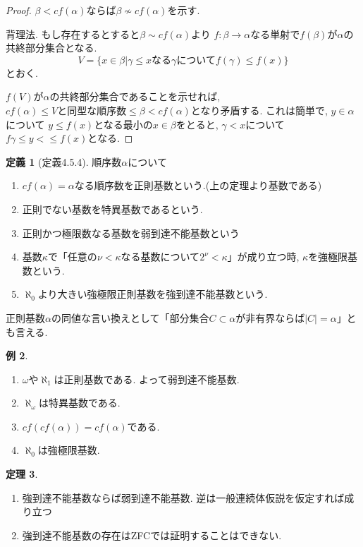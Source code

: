 \documentclass[dvipdfmx,a4paper,11pt]{article}
\theoremstyle{definition}
\newtheorem{thm}{定理}
\newtheorem{dfn}[thm]{定義}
\newtheorem{exa}[thm]{例}
\begin{document}
\begin{proof}
$\beta < cf(\alpha)$ならば$\beta \not \sim cf(\alpha)$を示す.

背理法. もし存在するとすると$\beta \sim cf(\alpha)$より
$f : \beta \to \alpha$なる単射で$f(\beta)$が$\alpha$の共終部分集合となる. 
$$
V= \{ x \in \beta| \gamma \le x \text{なる$\gamma$について} f(\gamma) \le f(x)\}
$$
とおく. 

$f(V)$が$\alpha$の共終部分集合であることを示せれば, $cf(\alpha) \le \text{$V$と同型な順序数} \le \beta < cf(\alpha)$となり矛盾する.
これは簡単で, $y \in \alpha$について
$y \le f(x)$となる最小の$x \in \beta$をとると, $\gamma < x $について
$f\gamma \le y < \le f(x) $となる. 
\end{proof}

 \begin{tcolorbox}
 [colback = white, colframe = green!35!black, fonttitle = \bfseries,breakable = true]
\begin{dfn}[定義4.5.4]
順序数$\alpha$について
\begin{enumerate}
\item $cf(\alpha) = \alpha$なる順序数を正則基数という.(上の定理より基数である)
\item 正則でない基数を特異基数であるという. 
\item 正則かつ極限数なる基数を弱到達不能基数という
\item 基数$\kappa$で「任意の$\nu < \kappa$なる基数について$2^{\nu}<\kappa$」が成り立つ時, $\kappa$を強極限基数という. 
\item $\aleph_0$より大きい強極限正則基数を強到達不能基数という. 
\end{enumerate}
\end{dfn}
\end{tcolorbox}

正則基数$\alpha$の同値な言い換えとして「部分集合$C \subset \alpha$が非有界ならば$|C| = \alpha$」とも言える.

\begin{exa}
\begin{enumerate}
\item $\omega$や$\aleph_1$は正則基数である. よって弱到達不能基数.
\item $\aleph_{\omega}$は特異基数である. 
\item $cf(cf(\alpha))= cf(\alpha)$である. 
\item $\aleph_0$は強極限基数. 
\end{enumerate}
\end{exa}

\begin{thm}
\begin{enumerate}
\item 強到達不能基数ならば弱到達不能基数. 逆は一般連続体仮説を仮定すれば成り立つ
\item 強到達不能基数の存在はZFCでは証明することはできない. 
\end{enumerate}
\end{thm}
\end{document}
